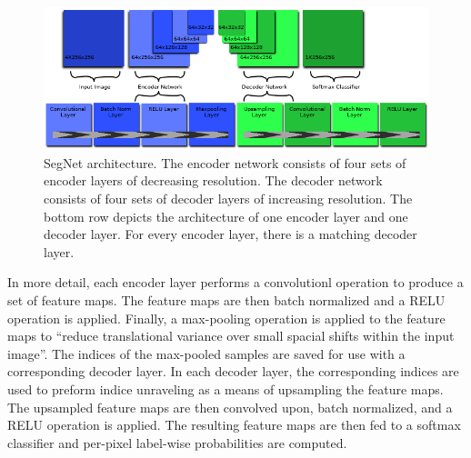 \documentclass[12pt]{article}
\begin{document}
\begin{figure}[!htb]
  \includegraphics[width=\linewidth]{images/network.png}
  \caption{SegNet architecture. The encoder network consists of four sets of encoder layers of decreasing resolution. The decoder network consists of four sets of decoder layers of increasing resolution. The bottom row depicts the architecture of one encoder layer and one decoder layer. For every encoder layer, there is a matching decoder layer.}
\end{figure}
In more detail, each encoder layer performs a convolutionl operation to produce a set of feature maps. The feature maps are then batch normalized and a RELU operation is applied. Finally, a max-pooling operation is applied to the feature maps to ``reduce translational variance over small spacial shifts within the input image''\cite{SegNet}. The indices of the max-pooled samples are saved for use with a corresponding decoder layer. In each decoder layer, the corresponding indices are used to preform indice unraveling as a means of upsampling the feature maps. The upsampled feature maps are then convolved upon, batch normalized, and a RELU operation is applied. The resulting feature maps are then fed to a softmax classifier and per-pixel label-wise probabilities are computed. 
\end{document}
